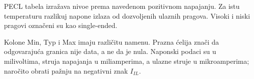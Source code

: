 PECL tabela izražava nivoe prema navedenom pozitivnom napajanju. Za istu temperaturu razlikuj napone izlaza od dozvoljenih ulaznih pragova. Visoki i niski pragovi označeni su kao single-ended.

Kolone Min, Typ i Max imaju različitu namenu. Prazna ćelija znači da odgovarajuća granica nije data, a ne da je nula. Naponski podaci su u milivoltima, struja napajanja u miliamperima, a ulazne struje u mikroamperima; naročito obrati pažnju na negativni znak $I_{IL}$.
